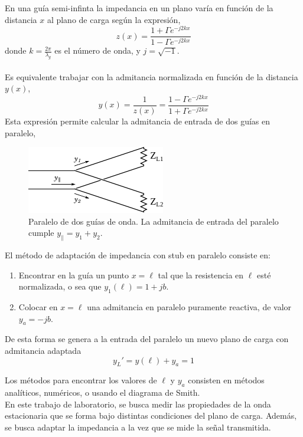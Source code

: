 \documentclass[11pt,a4paper]{article}
\begin{document}
\begin{multicols}{2}
En una guía semi-infinta la impedancia en un plano varía en función de la distancia $x$ al plano de carga según la expresión,
\begin{equation}
    z(x) = \frac{1 + \Gamma e^{-j2kx}}{1 - \Gamma e^{-j2kx}}
\end{equation}
donde $k=\frac{2\pi}{\lambda_g}$ es el número de onda, y $j=\sqrt{-1}$. \\ \\
Es equivalente trabajar con la admitancia normalizada en función de la distancia $y(x)$,
\begin{equation*}
    y(x) = \frac{1}{z(x)} = \frac{1 - \Gamma e^{-j2kx}}{1 + \Gamma e^{-j2kx}}
\end{equation*}
Esta expresión permite calcular la admitancia de entrada de dos guías en paralelo,
\begin{figure}[H]
    \centering
    \includegraphics[width=0.7\linewidth]{Images/guiapll.pdf}
    \caption{Paralelo de dos guías de onda. La admitancia de entrada del paralelo cumple $y_\parallel = y_1+y_2$.}
    \label{fig:pll}
\end{figure}

El método de adaptación de impedancia con stub en paralelo consiste en:
\begin{enumerate}
    \item Encontrar en la guía un punto $x = \ell$ tal que la resistencia en $\ell$ esté normalizada, o sea que $y_1(\ell)=1+jb$.
    \item Colocar en $x=\ell$ una admitancia en paralelo puramente reactiva, de valor $y_a = -jb$.
\end{enumerate}

De esta forma se genera a la entrada del paralelo un nuevo plano de carga con admitancia adaptada 
$$y_L' = y(\ell) + y_a = 1$$

Los métodos para encontrar los valores de $\ell$ y $y_a$ consisten en métodos analíticos, numéricos, o usando el diagrama de Smith.\\

En este trabajo de laboratorio, se busca medir las propiedades de la onda estacionaria que se forma bajo distintas condiciones del plano de carga. Además, se busca adaptar la impedancia a la vez que se mide la señal transmitida. 


\end{multicols}
\end{document}
